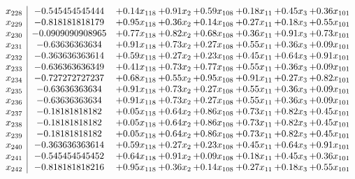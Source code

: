 \documentclass[8pt]{article}
\begin{document}
\[\begin{array}{c| c c@{\hskip 2pt} c@{\hskip 2pt} c@{\hskip 2pt} c@{\hskip 2pt} c@{\hskip 2pt} c@{\hskip 2pt} }
 x_{228}   &  -0.545454545444 & +  0.14 x_{118} & +  0.91 x_{2} & +  0.59 x_{108} & +  0.18 x_{11} & +  0.45 x_{3} & +  0.36 x_{101}\\
 x_{229}   &  -0.818181818179 & +  0.95 x_{118} & +  0.36 x_{2} & +  0.14 x_{108} & +  0.27 x_{11} & +  0.18 x_{3} & +  0.55 x_{101}\\
 x_{230}   &  -0.0909090908965 & +  0.77 x_{118} & +  0.82 x_{2} & +  0.68 x_{108} & +  0.36 x_{11} & +  0.91 x_{3} & +  0.73 x_{101}\\
 x_{231}   &  -0.63636363634 & +  0.91 x_{118} & +  0.73 x_{2} & +  0.27 x_{108} & +  0.55 x_{11} & +  0.36 x_{3} & +  0.09 x_{101}\\
 x_{232}   &  -0.363636363614 & +  0.59 x_{118} & +  0.27 x_{2} & +  0.23 x_{108} & +  0.45 x_{11} & +  0.64 x_{3} & +  0.91 x_{101}\\
 x_{233}   &  -0.636363636349 & +  0.41 x_{118} & +  0.73 x_{2} & +  0.77 x_{108} & +  0.55 x_{11} & +  0.36 x_{3} & +  0.09 x_{101}\\
 x_{234}   &  -0.727272727237 & +  0.68 x_{118} & +  0.55 x_{2} & +  0.95 x_{108} & +  0.91 x_{11} & +  0.27 x_{3} & +  0.82 x_{101}\\
 x_{235}   &  -0.63636363634 & +  0.91 x_{118} & +  0.73 x_{2} & +  0.27 x_{108} & +  0.55 x_{11} & +  0.36 x_{3} & +  0.09 x_{101}\\
 x_{236}   &  -0.63636363634 & +  0.91 x_{118} & +  0.73 x_{2} & +  0.27 x_{108} & +  0.55 x_{11} & +  0.36 x_{3} & +  0.09 x_{101}\\
 x_{237}   &  -0.18181818182 & +  0.05 x_{118} & +  0.64 x_{2} & +  0.86 x_{108} & +  0.73 x_{11} & +  0.82 x_{3} & +  0.45 x_{101}\\
 x_{238}   &  -0.18181818182 & +  0.05 x_{118} & +  0.64 x_{2} & +  0.86 x_{108} & +  0.73 x_{11} & +  0.82 x_{3} & +  0.45 x_{101}\\
 x_{239}   &  -0.18181818182 & +  0.05 x_{118} & +  0.64 x_{2} & +  0.86 x_{108} & +  0.73 x_{11} & +  0.82 x_{3} & +  0.45 x_{101}\\
 x_{240}   &  -0.363636363614 & +  0.59 x_{118} & +  0.27 x_{2} & +  0.23 x_{108} & +  0.45 x_{11} & +  0.64 x_{3} & +  0.91 x_{101}\\
 x_{241}   &  -0.545454545452 & +  0.64 x_{118} & +  0.91 x_{2} & +  0.09 x_{108} & +  0.18 x_{11} & +  0.45 x_{3} & +  0.36 x_{101}\\
 x_{242}   &  -0.818181818216 & +  0.95 x_{118} & +  0.36 x_{2} & +  0.14 x_{108} & +  0.27 x_{11} & +  0.18 x_{3} & +  0.55 x_{101}\\

\end{array}\]
\end{document}
